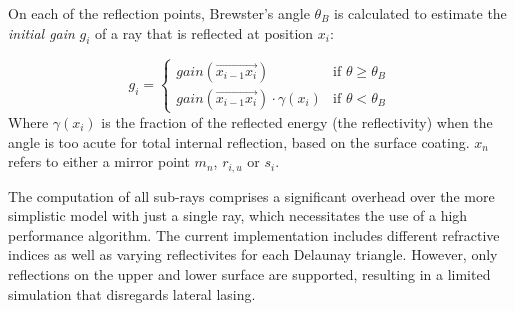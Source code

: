 On each of the reflection points, Brewster's angle $\theta_{B}$ is calculated to
estimate the \emph{initial gain} $g_i$ of a ray that is reflected at position
$x_i$:

\begin{equation}
\label{eq:gain_reflection}
  g_i = 
  \begin{cases}
    gain(\overrightarrow{x_{i-1}x_i}) & \text{if } \theta \ge \theta_{B}  \\
    gain(\overrightarrow{x_{i-1}x_i}) \cdot \gamma(x_i) & \text{if } \theta < \theta_{B}   
  \end{cases}
\end{equation}
Where $\gamma(x_i)$ is the fraction of the reflected energy (the reflectivity)
when the angle is too acute for total internal reflection, based on the surface
coating. $x_n$ refers to
either a mirror point $m_n$, $r_{i,u}$ or $s_i$.

The computation of all sub-rays comprises a significant overhead over the more
simplistic model with just a single ray, which necessitates the use of a high
performance algorithm.  The current implementation includes different refractive
indices as well as varying reflectivites for each Delaunay triangle. However,
only reflections on the upper and lower surface are supported, resulting in a
limited simulation that disregards lateral lasing. 
